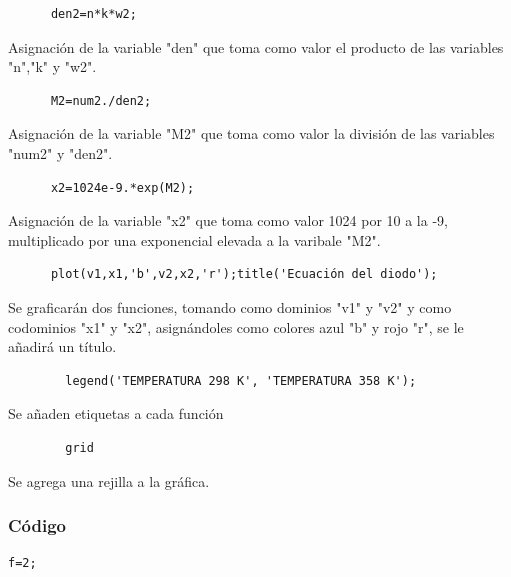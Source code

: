 \documentclass[]{article}
\begin{document}
	   \begin{verbatim}
	  den2=n*k*w2;
	   \end{verbatim}
	   
	   Asignación de la variable "den" que toma como valor el producto de las variables "n","k" y "w2".\\
	   
	   \begin{verbatim}
	  M2=num2./den2;
	   \end{verbatim}
	   
	   Asignación de la variable "M2" que toma como valor la división de las variables "num2" y "den2".\\
	   
	   \begin{verbatim}
	  x2=1024e-9.*exp(M2);
	   \end{verbatim}
	   
	   Asignación de la variable "x2" que toma como valor 1024 por 10 a la -9, multiplicado por una exponencial elevada a la varibale "M2".\\
	   
	   \begin{verbatim}
	  plot(v1,x1,'b',v2,x2,'r');title('Ecuación del diodo');
	   \end{verbatim}
	   
	   Se graficarán dos funciones, tomando como dominios "v1" y "v2" y como codominios "x1" y "x2", asignándoles como colores azul "b" y rojo "r", se le añadirá un título.\\ 
	   
	   \begin{verbatim}
	    legend('TEMPERATURA 298 K', 'TEMPERATURA 358 K');
	    \end{verbatim}
	    
	    Se añaden etiquetas a cada función
	    
	    \begin{verbatim}
	    grid 
	   \end{verbatim}
	   
	   Se agrega una rejilla a la gráfica.\\
	   
\subsubsection{Código}

  \begin{verbatim}
f=2;
\end{verbatim}
\end{document}
